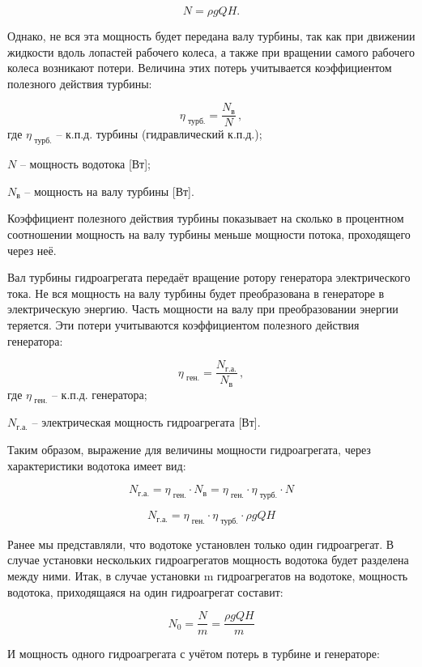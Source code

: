 $$
  N = \rho g Q H .
$$

Однако, не вся эта мощность будет передана валу турбины, так как при движении жидкости вдоль лопастей рабочего колеса, а также при вращении самого рабочего колеса возникают потери. Величина этих потерь учитывается коэффициентом полезного действия турбины:

$$
   \eta_{\text{ турб.}} = \frac{N_\text{в}}{N} \, ,
$$
где $ \eta_{\text{ турб.}} $ -- к.п.д. турбины (гидравлический к.п.д.);

$ N $ -- мощность водотока [Вт]; 

$ N_\text{в} $ -- мощность на валу турбины [Вт].

\vspace{0.5 cm}

Коэффициент полезного действия турбины показывает на сколько в процентном соотношении мощность на валу турбины меньше мощности потока, проходящего через неё.

Вал турбины гидроагрегата передаёт вращение ротору генератора электрического тока. Не вся мощность на валу турбины будет преобразована в генераторе в электрическую энергию. Часть мощности на валу при преобразовании энергии теряется. Эти потери учитываются коэффициентом полезного действия генератора:

$$
   \eta_{\text{ ген.}} = \frac{N_\text{г.а.}}{N_\text{в}} \, ,
$$
где $ \eta_{\text{ ген.}} $ -- к.п.д. генератора;

$ N_\text{г.а.} $ -- электрическая мощность гидроагрегата [Вт]. 

\vspace{0.5 cm}

Таким образом, выражение для величины мощности гидроагрегата, через характеристики водотока имеет вид:

$$
   N_\text{г.а.} = \eta_{\text{ ген.}} \cdot N_\text{в} = \eta_{\text{ ген.}} \cdot \eta_{\text{ турб.}} \cdot N 
$$
 
$$
   N_\text{г.а.} = \eta_{\text{ ген.}} \cdot \eta_{\text{ турб.}} \cdot \rho g Q H
$$

Ранее мы представляли, что водотоке установлен только один гидроагрегат. В случае установки нескольких гидроагрегатов мощность водотока будет разделена между ними. Итак, в случае установки m гидроагрегатов на водотоке, мощность водотока, приходящаяся на один гидроагрегат составит:

$$
   N_0 = \frac{N}{m} = \frac{\rho g Q H}{m}
$$ 

И мощность одного гидроагрегата с учётом потерь в турбине и генераторе:

